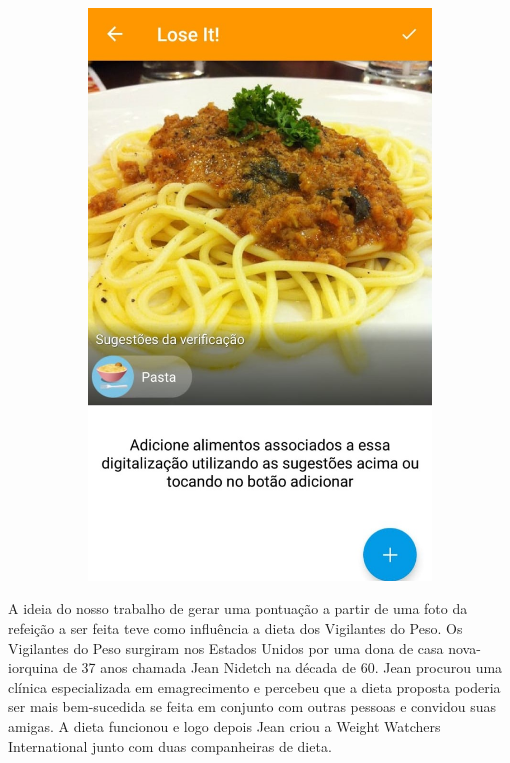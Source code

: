 \begin{figure}[!ht]
\begin{subfigure}{0.4\textwidth}
  \includegraphics[width=\textwidth]{imgs/loseit.jpeg}
  \label{fig:subApps2}
\end{subfigure}

\label{fig:test}
\end{figure}

A ideia do nosso trabalho de gerar uma pontuação a partir de uma foto da refeição a ser feita teve como influência a dieta dos Vigilantes do Peso. Os Vigilantes do Peso surgiram nos Estados Unidos por uma dona de casa nova-iorquina de 37 anos chamada Jean Nidetch na década de 60. Jean procurou uma clínica especializada em emagrecimento e percebeu que a dieta proposta poderia ser mais bem-sucedida se feita em conjunto com outras pessoas e convidou suas amigas. A dieta funcionou e logo depois Jean criou a Weight Watchers International junto com duas companheiras de dieta.

